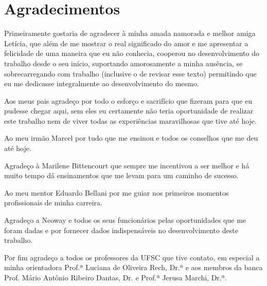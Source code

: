 \chapter*{Agradecimentos}

Primeiramente gostaria de agradecer à minha amada namorada e melhor
amiga Letícia, que além de me mostrar o real significado do amor e
me apresentar a felicidade de uma maneira que eu não conhecia,
cooperou no desenvolvimento do trabalho desde o seu início, suportando
amorosamente a minha ausência, se sobrecarregando com trabalho
(inclusive o de revisar esse texto) permitindo que eu me dedicasse
integralmente ao desenvolvimento do mesmo.

Aos meus pais agradeço por todo o esforço e sacrifício que fizeram
para que eu pudesse chegar aqui, sem eles eu certamente não teria
oportunidade de realizar este trabalho nem de viver todas as
experiências maravilhosas que tive até hoje.

Ao meu irmão Marcel por tudo que me ensinou e todos os conselhos que
me deu até hoje.

Agradeço à Marilene Bittencourt que sempre me incentivou a ser melhor
e há muito tempo dá ensinamentos que me levam para um caminho de
sucesso.

Ao meu mentor Eduardo Bellani por me guiar nos primeiros momentos
profissionais de minha carreira.

Agradeço a Neoway e todos os seus funcionários pelas oportunidades que
me foram dadas e por fornecer dados indispensáveis no desenvolvimento
deste trabalho.

Por fim agradeço a todos os professores da UFSC que tive contato, em
especial a minha orientadora Prof.ª Luciana de Oliveira Rech, Dr.ª e aos
membros da banca Prof. Mário Antônio Ribeiro Dantas, Dr. e Prof.ª 
Jerusa Marchi, Dr.ª.